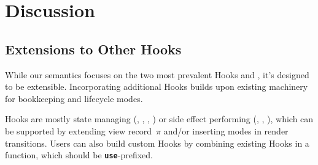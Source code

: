 \chapter{Discussion}\label{chap:discussion}
\section{Extensions to Other Hooks}
While our semantics focuses on the two most prevalent Hooks  and \mbox{,} it's designed to be extensible.
Incorporating additional Hooks builds upon existing machinery for bookkeeping and lifecycle modes.

Hooks are mostly state managing (, , , ) or side effect performing (, , ), which can be supported by extending view record~$\pi$ and/or inserting modes in render transitions.
Users can also build custom Hooks by combining existing Hooks in a function, which should be \textbf{\texttt{use}}-prefixed.

